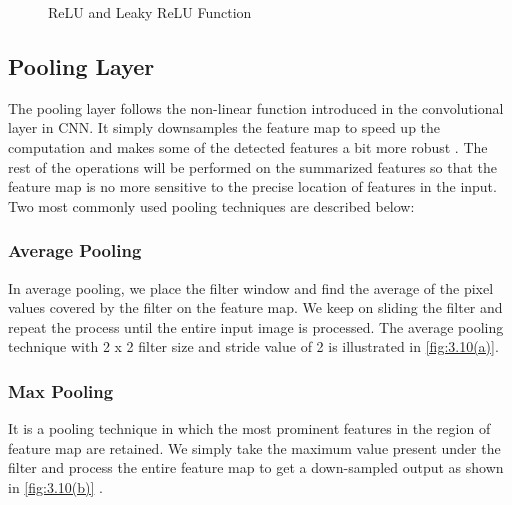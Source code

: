 
\begin{figure}%
    \centering
    \qquad
    \caption{ReLU and Leaky ReLU Function}%
    \label{fig:3.9}%
\end{figure}

\subsection{Pooling Layer}
The pooling layer follows the non-linear function introduced in the convolutional layer in CNN. It simply downsamples the feature map to speed up the computation and makes some of the detected features a bit more robust \cite{chap_3_article:4}. The rest of the operations will be performed on the summarized features so that the feature map is no more sensitive to the precise location of features in the input. Two most 
commonly used pooling techniques are described below:

\subsubsection{Average Pooling}

In average pooling, we place the filter window and find the average of the pixel values covered by the filter on the feature map. We keep on sliding the filter and repeat the process until the entire input image is processed. The average pooling 
technique with 2 x 2 filter size and 
stride value of 2 is illustrated in \ref{fig:3.10(a)}.

\subsubsection{Max Pooling}
It is a pooling technique in which the most prominent features in the region of feature map are retained. We simply 
take the maximum value present under the filter and process the entire 
feature map to get a down-sampled output as shown in \ref{fig:3.10(b)} \cite{chap_3_article:6}.

